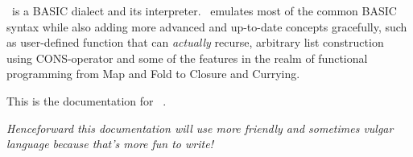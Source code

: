 \tbas\ is a BASIC dialect and its interpreter. \tbas\ emulates most of the common BASIC syntax while also adding more advanced and up-to-date concepts gracefully, such as user-defined function that can \emph{actually} recurse, arbitrary list construction using CONS-operator and some of the features in the realm of functional programming from Map and Fold to Closure and Currying.

This is the documentation for \tbas\ \tbasver.

\vfill

\small\emph{Henceforward this documentation will use more friendly and sometimes vulgar language because that's more fun to write!}
